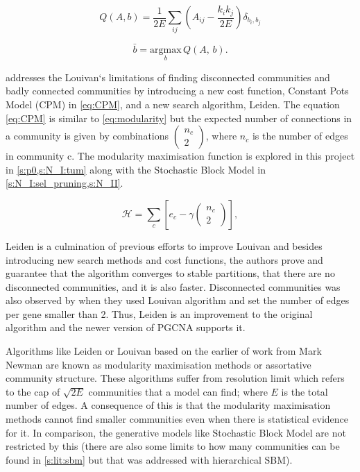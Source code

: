 \begin{equation} \label{eq:mod_max_cost}
    Q(A,b) = \frac{1}{2E} \sum_{ij} \left( A_{ij} - \frac{k_i k_j}{2E} \right) \delta_{b_i, b_j}
\end{equation}

\begin{equation} \label{eq:mod_max_per_com}
    \bar{b} = \underset{b}{\mathrm{argmax}} \, Q(A, \, b).
\end{equation}

\citet{Traag2019-ne} addresses the Louivan`s limitations of finding disconnected communities and badly connected communities by introducing a new cost function, Constant Pots Model (CPM) in \cref{eq:CPM}, and a new search algorithm, Leiden. The equation \cref{eq:CPM} is similar to \cref{eq:modularity} but the expected number of connections in a community is given by combinations $(\begin{array}{c}{n}_{c}\\ 2\end{array})$, where $n_c$ is the number of edges in community c. The modularity maximisation function is explored in this project in \cref{s:p0,s:N_I:tum} along with the Stochastic Block Model in \cref{s:N_I:sel_pruning,s:N_II}.

\begin{equation} \label{eq:CPM}
    {\mathcal H} ={\sum }_{c}[{e}_{c}-\gamma (\begin{array}{c}{n}_{c}\\ 2\end{array})],
\end{equation}

Leiden is a culmination of previous efforts to improve Louivan\cite{Ozaki2016-dl,Waltman2013-zw,Bae2017-rz, Traag2015-tq} and besides introducing new search methods and cost functions, the authors prove and guarantee that the algorithm converges to stable partitions, that there are no disconnected communities, and it is also faster. Disconnected communities was also observed by \citet{Care2019-ij} when they used Louivan algorithm and set the number of edges per gene smaller than 2. Thus, Leiden is an improvement to the original algorithm and the newer version of PGCNA \cite{Care2019-ij} supports it.

Algorithms like Leiden or Louivan based on the earlier of work from Mark Newman \cite{Newman2004-dd, Newman2006-fa} are known as modularity maximisation methods or assortative community structure. These algorithms suffer from resolution limit\cite{Fortunato2007-gh, Peixoto2021-jx} which refers to the cap of $\sqrt{2E}$ communities that a model can find; where $E$ is the total number of edges. A consequence of this is that the modularity maximisation methods cannot find smaller communities even when there is statistical evidence for it. In comparison, the generative models like Stochastic Block Model are not restricted by this (there are also some limits to how many communities can be found in \cref{s:lit:sbm} but that was addressed with hierarchical SBM).

